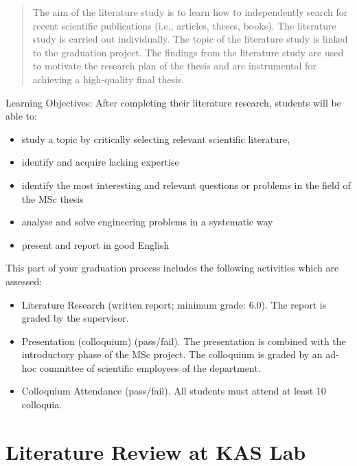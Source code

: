 \begin{quote}
The aim of the literature study is to learn how to independently search for recent scientific publications (i.e., articles, theses, books). The literature study is carried out individually. The topic of the literature study is linked to the graduation project. The findings from the literature study are used to motivate the research plan of the thesis and are instrumental for achieving a high-quality final thesis.
\end{quote}

Learning Objectives:
After completing their literature research, students will be able to:
\begin{itemize}
    \item study a topic by critically selecting relevant scientific literature,
    \item identify and acquire lacking expertise
    \item identify the most interesting and relevant questions or problems in the field of the MSc thesis
    \item analyse and solve engineering problems in a systematic way
    \item present and report in good English
\end{itemize}

This part of your graduation process includes the following activities which are assessed:
\begin{itemize}
    \item Literature Research (written report; minimum grade: 6.0). The report is graded by the supervisor.
    \item Presentation (colloquium) (pass/fail). The presentation is combined with the introductory phase of the MSc project. The colloquium is graded by an ad-hoc committee of scientific employees of the department.
    \item Colloquium Attendance (pass/fail). All students must attend at least 10 colloquia.
\end{itemize}
	
\section{Literature Review at KAS Lab}
